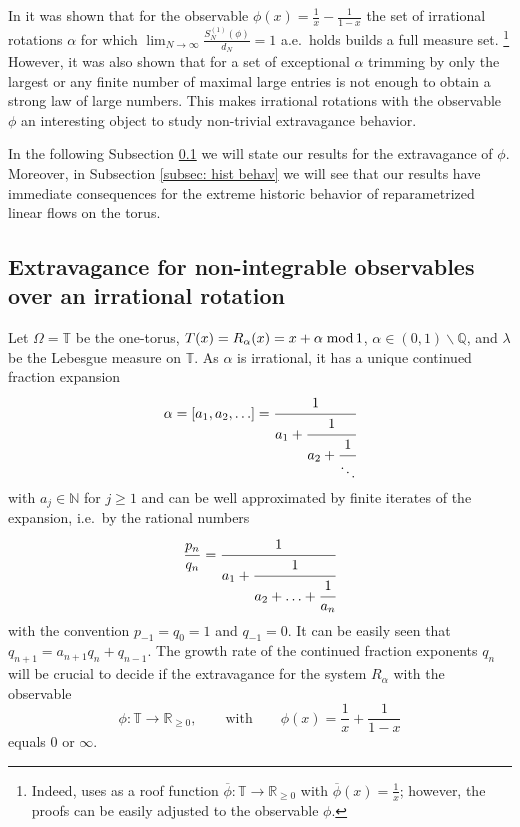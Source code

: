 \documentclass[11pt]{amsart}
\theoremstyle{definition}
\numberwithin{equation}{section}
\def\R{\mathbb{R}}
\def\T{\mathbb{T}}
\def\N{\mathbb{N}}
\begin{document}
In \cite{au_schi} it was shown that for the observable $\phi(x)=\frac{1}{x}-\frac{1}{1-x}$ the set of irrational rotations $\alpha$ for which $\lim_{N\to\infty}\frac{S_N^{(1)}(\phi)}{d_N}=1$ a.e.\ holds builds a full measure set. \footnote{Indeed, \cite{au_schi} uses as a roof function $\overline{\phi}:\T\to\R_{\geq0}$ with  $\overline{\phi}(x)=\frac{1}{x}$; however, the proofs can be easily adjusted to the observable $\phi$.}
However, it was also shown that for a set of exceptional $\alpha$ trimming by only the largest or any finite number of maximal large entries is not enough to obtain a strong law of large numbers.  
This makes irrational rotations with the observable $\phi$ an interesting object to study non-trivial extravagance behavior. 


In the following Subsection \ref{subsec: extravag} we will state our results for the extravagance of $\phi$. 
Moreover, in Subsection \ref{subsec: hist behav} we will see that our results have immediate consequences for the extreme historic behavior of reparametrized linear flows on the torus.





\subsection{Extravagance for non-integrable observables over an irrational rotation}\label{subsec: extravag}
Let $\Omega=\mathbb{T}$ be the one-torus, $T(x)=R_{\alpha}(x)=x+\alpha\; \rm{mod}\, 1$, $\alpha\in(0,1)\backslash\mathbb{Q}$, and $\lambda$ be the Lebesgue measure on $\T$.  
As $\alpha$ is irrational, it has a unique continued fraction expansion 
\begin{align*}
 \alpha= [a_1 , a_2 , \ldots]=\cfrac{1}{a_1+\cfrac{1}{a_2+\cfrac{1}{\ddots}}}
\end{align*}
with $a_j \in \N$ for $j \geq 1$ and can be well approximated by finite iterates of the expansion, i.e.\ by the rational numbers
\begin{align*}
 \frac{p_n}{q_n}=\cfrac{1}{a_1+\cfrac{1}{a_2+\ldots+\cfrac{1}{a_{n}}}}
\end{align*}
with the convention $p_{-1}=q_0=1$ and $q_{-1} = 0$.
 It can be easily seen that $q_{n+1}=a_{n+1}q_n+q_{n-1}$.
The growth rate of the continued fraction exponents $q_n$ will be crucial to decide if the extravagance for the system $R_\alpha$ with the observable
$$\phi:\T\to\R_{\geq 0},\qquad \text{with}\qquad \phi(x)=\frac{1}{x}+\frac{1}{1-x}$$
equals $0$ or $\infty$. 
\end{document}
